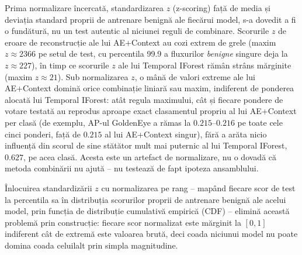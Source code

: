 Prima normalizare încercată, standardizarea $z$ (z-scoring) față de media și deviația standard proprii de antrenare benignă ale fiecărui model, s-a dovedit a fi o fundătură, nu un test autentic al niciunei reguli de combinare. Scorurile $z$ de eroare de reconstrucție ale lui AE+Context au cozi extrem de grele (maxim $z \approx 2366$ pe setul de test, cu percentila 99.9 a fluxurilor \emph{benigne} singure deja la $z \approx 227$), în timp ce scorurile $z$ ale lui Temporal IForest rămân strâns mărginite (maxim $z \approx 21$). Sub normalizarea $z$, o mână de valori extreme ale lui AE+Context domină orice combinație liniară sau maxim, indiferent de ponderea alocată lui Temporal IForest: atât regula maximului, cât și fiecare pondere de votare testată au reprodus aproape exact clasamentul propriu al lui AE+Context per clasă (de exemplu, AP-ul GoldenEye a rămas la $0.215$--$0.216$ pe toate cele cinci ponderi, față de $0.215$ al lui AE+Context singur), fără a arăta nicio influență din scorul de sine stătător mult mai puternic al lui Temporal IForest, $0.627$, pe acea clasă. Acesta este un artefact de normalizare, nu o dovadă că metoda combinării nu ajută -- nu testează de fapt ipoteza ansamblului.

Înlocuirea standardizării $z$ cu normalizarea pe rang -- mapând fiecare scor de test la percentila sa în distribuția scorurilor proprii de antrenare benignă ale acelui model, prin funcția de distribuție cumulativă empirică (CDF) -- elimină această problemă prin construcție: fiecare scor normalizat este mărginit la $[0,1]$ indiferent cât de extremă este valoarea brută, deci coada niciunui model nu poate domina coada celuilalt prin simpla magnitudine.